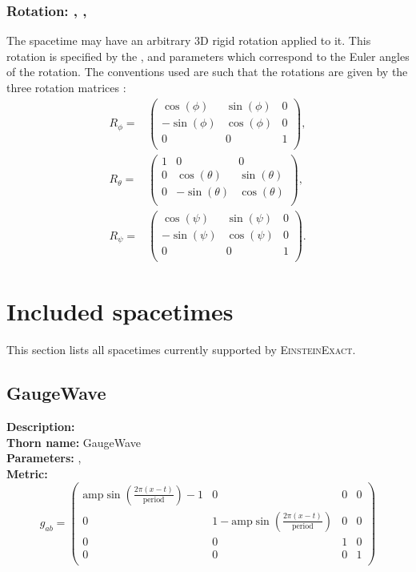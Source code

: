 \documentclass{article}
\begin{document}
\subsubsection{Rotation: , , }
The spacetime may have an arbitrary $3$D rigid rotation applied to it. This
rotation is specified by the ,  and  parameters
which correspond to the Euler angles of the rotation. The conventions used are
such that the rotations are given by the three rotation matrices \cite{EinsteinExact_Euler}:
\begin{align}
R_\phi =& 
\left(
\begin{array}{ccc}
 \cos (\phi ) & \sin (\phi ) & 0 \\
 -\sin (\phi ) & \cos (\phi ) & 0 \\
 0 & 0 & 1 \\
\end{array}
\right), \nonumber \\
R_\theta =&
\left(
\begin{array}{ccc}
 1 & 0 & 0 \\
 0 & \cos (\theta ) & \sin (\theta ) \\
 0 & -\sin (\theta ) & \cos (\theta ) \\
\end{array}
\right), \nonumber \\
R_\psi =&
\left(
\begin{array}{ccc}
 \cos (\psi ) & \sin (\psi ) & 0 \\
 -\sin (\psi ) & \cos (\psi ) & 0 \\
 0 & 0 & 1 \\
\end{array}
\right).
\end{align}

\section{Included spacetimes}

This section lists all spacetimes currently supported by \textsc{EinsteinExact}.


\subsection{GaugeWave}
{\bf Description:}   \\
{\bf Thorn name:} GaugeWave \\
{\bf Parameters:} ,  \\
{\bf Metric:} \\
\begin{equation}
g_{ab} =
\left(
\begin{array}{cccc}
 \text{amp} \sin \left(\frac{2 \pi  (x-t)}{\text{period}}\right)-1 & 0 & 0 & 0 \\
 0 & 1-\text{amp} \sin \left(\frac{2 \pi  (x-t)}{\text{period}}\right) & 0 & 0 \\
 0 & 0 & 1 & 0 \\
 0 & 0 & 0 & 1 \\
\end{array}
\right)
\end{equation}
\end{document}

